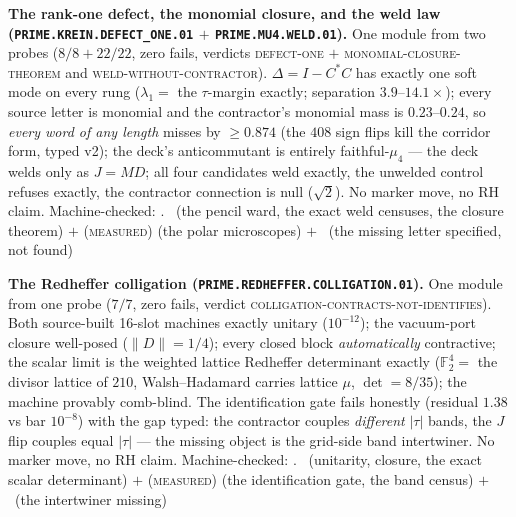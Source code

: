 \documentclass[11pt,a4paper]{article}
\theoremstyle{definition}
\begin{document}
\par\smallskip\noindent\textbf{The rank-one defect, the monomial
closure, and the weld law
(\texttt{PRIME.KREIN.\allowbreak DEFECT\_ONE.01} $+$
\texttt{PRIME.MU4.\allowbreak WELD.01}).}
One module from two probes ($8/8 + 22/22$, zero fails, verdicts
\textsc{defect-one} $+$ \textsc{monomial-closure-theorem} and
\textsc{weld-without-contractor}).  $\Delta = I - C^*C$ has
exactly one soft mode on every rung ($\lambda_1 = $ the
$\tau$-margin exactly; separation $3.9$--$14.1\times$); every
source letter is monomial and the contractor's monomial mass is
$0.23$--$0.24$, so \emph{every word of any length} misses by
$\ge 0.874$ (the $408$ sign flips kill the corridor form, typed
v2); the deck's anticommutant is entirely faithful-$\mu_4$ ---
the deck welds only as $J = MD$; all four candidates weld
exactly, the unwelded control refuses exactly, the contractor
connection is null ($\sqrt2$).  No marker move, no RH claim.
Machine-checked: .
\mE\ (the pencil ward, the exact weld censuses, the closure
theorem) $+$ (\textsc{measured}) (the polar microscopes) $+$
\mO\ (the missing letter specified, not found)
\par\smallskip

\par\smallskip\noindent\textbf{The Redheffer colligation
(\texttt{PRIME.REDHEFFER.\allowbreak COLLIGATION.01}).}
One module from one probe ($7/7$, zero fails, verdict
\textsc{colligation-contracts-not-identifies}).  Both
source-built 16-slot machines exactly unitary ($10^{-12}$); the
vacuum-port closure well-posed ($\|D\| = 1/4$); every closed
block \emph{automatically} contractive; the scalar limit is the
weighted lattice Redheffer determinant exactly
($\mathbb{F}_2^4 = $ the divisor lattice of $210$,
Walsh--Hadamard carries lattice $\mu$, $\det = 8/35$); the
machine provably comb-blind.  The identification gate fails
honestly (residual $1.38$ vs bar $10^{-8}$) with the gap typed:
the contractor couples \emph{different} $|\tau|$ bands, the $J$
flip couples equal $|\tau|$ --- the missing object is the
grid-side band intertwiner.  No marker move, no RH claim.
Machine-checked: .
\mE\ (unitarity, closure, the exact scalar determinant) $+$
(\textsc{measured}) (the identification gate, the band census)
$+$ \mO\ (the intertwiner missing)
\par\smallskip
\end{document}
